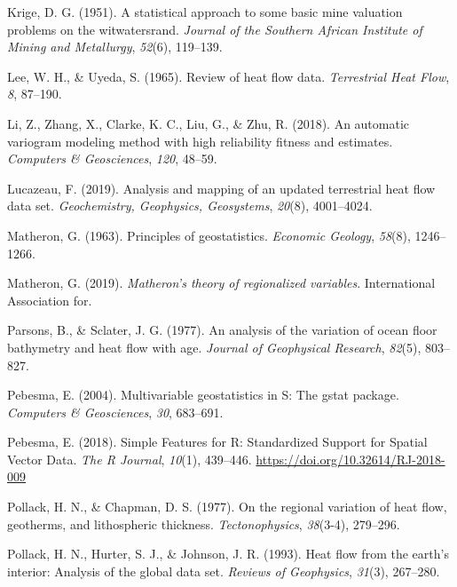 \documentclass[draft,linenumbers]{agujournal2018}
\begin{document}
\leavevmode{}%
Krige, D. G. (1951). A statistical approach to some basic mine valuation
problems on the witwatersrand. \emph{Journal of the Southern African
Institute of Mining and Metallurgy}, \emph{52}(6), 119--139.

\leavevmode{}%
Lee, W. H., \& Uyeda, S. (1965). Review of heat flow data.
\emph{Terrestrial Heat Flow}, \emph{8}, 87--190.

\leavevmode{}%
Li, Z., Zhang, X., Clarke, K. C., Liu, G., \& Zhu, R. (2018). An
automatic variogram modeling method with high reliability fitness and
estimates. \emph{Computers \& Geosciences}, \emph{120}, 48--59.

\leavevmode{}%
Lucazeau, F. (2019). Analysis and mapping of an updated terrestrial heat
flow data set. \emph{Geochemistry, Geophysics, Geosystems},
\emph{20}(8), 4001--4024.

\leavevmode{}%
Matheron, G. (1963). Principles of geostatistics. \emph{Economic
Geology}, \emph{58}(8), 1246--1266.

\leavevmode{}%
Matheron, G. (2019). \emph{Matheron's theory of regionalized variables}.
International Association for.

\leavevmode{}%
Parsons, B., \& Sclater, J. G. (1977). An analysis of the variation of
ocean floor bathymetry and heat flow with age. \emph{Journal of
Geophysical Research}, \emph{82}(5), 803--827.

\leavevmode{}%
Pebesma, E. (2004). Multivariable geostatistics in {S}: The gstat
package. \emph{Computers \& Geosciences}, \emph{30}, 683--691.

\leavevmode{}%
Pebesma, E. (2018). {Simple Features for R: Standardized Support for
Spatial Vector Data}. \emph{{The R Journal}}, \emph{10}(1), 439--446.
\url{https://doi.org/10.32614/RJ-2018-009}

\leavevmode{}%
Pollack, H. N., \& Chapman, D. S. (1977). On the regional variation of
heat flow, geotherms, and lithospheric thickness. \emph{Tectonophysics},
\emph{38}(3-4), 279--296.

\leavevmode{}%
Pollack, H. N., Hurter, S. J., \& Johnson, J. R. (1993). Heat flow from
the earth's interior: Analysis of the global data set. \emph{Reviews of
Geophysics}, \emph{31}(3), 267--280.
\end{document}
